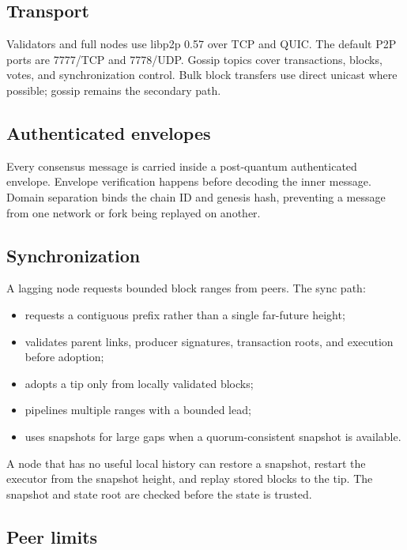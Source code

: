 \documentclass[11pt,a4paper]{article}
\begin{document}
\subsection{Transport}

Validators and full nodes use libp2p 0.57 over TCP and QUIC. The default P2P
ports are 7777/TCP and 7778/UDP. Gossip topics cover transactions, blocks,
votes, and synchronization control. Bulk block transfers use direct unicast
where possible; gossip remains the secondary path.

\subsection{Authenticated envelopes}

Every consensus message is carried inside a post-quantum authenticated
envelope. Envelope verification happens before decoding the inner message.
Domain separation binds the chain ID and genesis hash, preventing a message
from one network or fork being replayed on another.

\subsection{Synchronization}

A lagging node requests bounded block ranges from peers. The sync path:
\begin{itemize}[leftmargin=*]
  \item requests a contiguous prefix rather than a single far-future height;
  \item validates parent links, producer signatures, transaction roots, and
        execution before adoption;
  \item adopts a tip only from locally validated blocks;
  \item pipelines multiple ranges with a bounded lead;
  \item uses snapshots for large gaps when a quorum-consistent snapshot is
        available.
\end{itemize}

A node that has no useful local history can restore a snapshot, restart the
executor from the snapshot height, and replay stored blocks to the tip. The
snapshot and state root are checked before the state is trusted.

\subsection{Peer limits}
\end{document}

